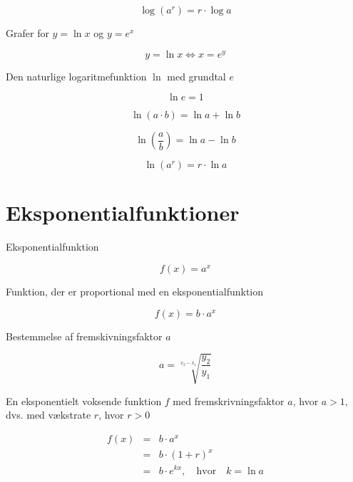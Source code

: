 \documentclass[11pt,a4paper,landscape,twocolumn,fleqn,leqno]{article}
\begin{document}
\begin{equation}
\log(a^r) = r \cdot \log a
\end{equation}

Grafer for $y = \ln x$ og $y = e^x$

\begin{equation}
y = \ln x \Leftrightarrow x = e^y
\end{equation}

Den naturlige logaritmefunktion $\ln$ med grundtal $e$

\begin{equation}
\ln e = 1
\end{equation}

\begin{equation}
\ln (a \cdot b) = \ln a + \ln b
\end{equation}

\begin{equation}
\ln\left(\frac{a}{b}\right) = \ln a - \ln b
\end{equation}

\begin{equation}
\ln(a^r) = r \cdot \ln a
\end{equation}

\vfill

\section{Eksponentialfunktioner}

Eksponentialfunktion

\begin{equation}
f(x) = a^x
\end{equation}

Funktion, der er proportional med en eksponentialfunktion

\begin{equation}
f(x) = b \cdot a^x
\end{equation}

Bestemmelse af fremskivningsfaktor $a$

\begin{equation}
a = \sqrt[x_2-x_1]{\frac{y_2}{y_1}}
\end{equation}

En eksponentielt voksende funktion $f$ med fremskrivningsfaktor $a$, hvor $a > 1$, dvs. med vækstrate $r$, hvor $r > 0$

\begin{eqnarray}
f(x) & = & b \cdot a^x \\
 & = & b \cdot (1+r)^x \nonumber \\
 & = & b \cdot e^{kx}, \quad \text{hvor} \quad k = \ln a \nonumber
\end{eqnarray}
\end{document}
